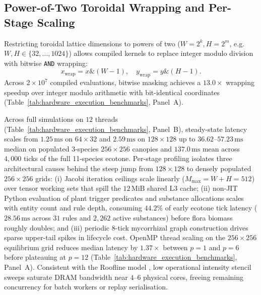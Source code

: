 \subsection{Power-of-Two Toroidal Wrapping and Per-Stage Scaling}
\label{subsec:branchless_toroidal}

Restricting toroidal lattice dimensions to powers of two ($W = 2^k, H = 2^m$, e.g.\ $W, H \in \{32, \dots, 1024\}$) allows compiled kernels to replace integer modulo division with bitwise \texttt{AND} wrapping:
\begin{equation}
  x_{\mathrm{wrap}} = x \mathrel{\&} (W - 1), \quad y_{\mathrm{wrap}} = y \mathrel{\&} (H - 1).
  \label{eq:bitwise_masking}
\end{equation}
Across $2 \times 10^7$ compiled evaluations, bitwise masking achieves a $13.0\times$ wrapping speedup over integer modulo arithmetic with bit-identical coordinates (Table~\ref{tab:hardware_execution_benchmarks}, Panel~A).

Across full simulations on $12$ threads (Table~\ref{tab:hardware_execution_benchmarks}, Panel~B), steady-state latency scales from $1.25\,\text{ms}$ on $64 \times 32$ and $2.59\,\text{ms}$ on $128 \times 128$ up to $36.62\text{--}57.23\,\text{ms}$ median on populated 3-species $256 \times 256$ canopies and $137.0\,\text{ms}$ mean across $4{,}000$ ticks of the full 11-species ecotone. Per-stage profiling isolates three architectural causes behind the steep jump from $128 \times 128$ to densely populated $256 \times 256$ grids: (i) Jacobi iteration ceilings scale linearly ($M_{\max} = W + H = 512$) over tensor working sets that spill the $12\,\text{MiB}$ shared L3 cache; (ii) non-JIT Python evaluation of plant trigger predicates and substance allocations scales with entity count and rule depth, consuming $44.2\%$ of early ecotone tick latency ($28.56\,\text{ms}$ across $31$ rules and $2{,}262$ active substances) before flora biomass roughly doubles; and (iii) periodic $8$-tick mycorrhizal graph construction drives sparse upper-tail spikes in lifecycle cost. OpenMP thread scaling on the $256 \times 256$ equilibrium grid reduces median latency by $1.37\times$ between $p = 1$ and $p = 6$ before plateauing at $p = 12$ (Table~\ref{tab:hardware_execution_benchmarks}, Panel~A). Consistent with the Roofline model \cite{williams2009roofline}, low operational intensity stencil sweeps saturate DRAM bandwidth near $4\text{--}6$ physical cores, freeing remaining concurrency for batch workers or replay serialisation.

